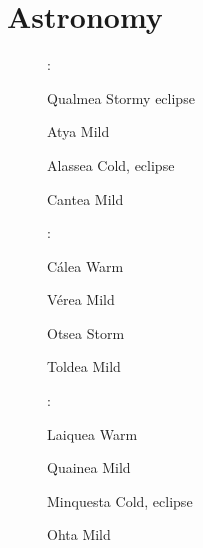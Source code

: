 
\renewcommand{\headingtype}{APPENDIX}

\appendix

\appendixpage

\addappheadtotoc

\chapter{Astronomy}\label{astronomy}\label{seasons}
\setcounter{list}{0}\setcounter{enc}{0}

\begin{wrapfigure}{R}{.55\textwidth}
\begin{tcolorbox}
\begin{list}{\addtocounter{enc}{1} \bf Cycle }{}

\item :


\begin{list}{\addtocounter{list}{1}}{}

\item Qualmea  Stormy eclipse

\item Atya  Mild

\item Alassea  Cold, eclipse

\item Cantea  Mild
\end{list}

\item :

\begin{list}{\addtocounter{list}{1}}{}
\item C\'{a}lea  Warm

\item V\'{e}rea  Mild

\item Otsea  Storm

\item Toldea  Mild

\end{list}

\item :

\begin{list}{\addtocounter{list}{1}}{}

\item Laiquea  Warm

\item Quainea  Mild

\item Minquesta  Cold, eclipse

\item Ohta  Mild

\end{list}

\end{list}

\end{tcolorbox}
\end{wrapfigure}



